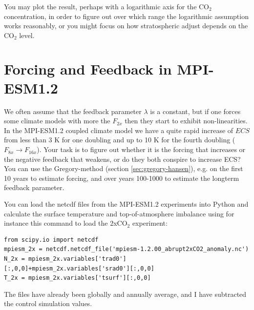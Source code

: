 \documentclass[12pt]{book}
\begin{document}
You may plot the result, perhaps with a logarithmic axis for the CO$_2$ concentration, in order to figure out over which range the logarithmic assumption works reasonably, or you might focus on how stratospheric adjust depends on the CO$_2$ level.


\section{Forcing and Feedback in MPI-ESM1.2}
We often assume that the feedback parameter $\lambda$ is a constant, but if one forces some climate models with more the $F_{2x}$ then they start to exhibit non-linearities. In the MPI-ESM1.2 coupled climate model we have a quite rapid increase of $ECS$ from less than 3 K for one doubling and up to 10 K for the fourth doubling ($F_{8x} \rightarrow F_{16x}$). Your task is to figure out whether it is the forcing that increases or the negative feedback that weakens, or do they both conspire to increase ECS? You can use the Gregory-method (section \ref{sec:gregory-hansen}), e.g. on the first 10 years to estimate forcing, and over years 100-1000 to estimate the longterm feedback parameter.

You can load the netcdf files from the MPI-ESM1.2 experiments into Python and calculate the surface temperature and top-of-atmosphere imbalance using for instance this command to load the 2xCO$_2$ experiment:
\begin{verbatim}
from scipy.io import netcdf
mpiesm_2x = netcdf.netcdf_file('mpiesm-1.2.00_abrupt2xCO2_anomaly.nc')
N_2x = mpiesm_2x.variables['trad0'][:,0,0]+mpiesm_2x.variables['srad0'][:,0,0]
T_2x = mpiesm_2x.variables['tsurf'][:,0,0]
\end{verbatim}
The files have already been globally and annually average, and I have subtracted the control simulation values.
\end{document}
